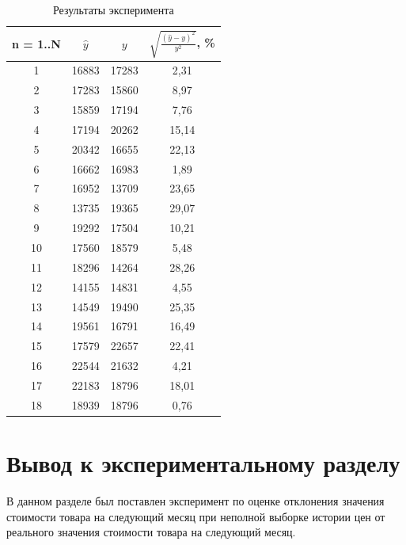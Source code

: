 \documentclass[a4paper,14pt]{extreport}
\begin{document}
\begin{table}[H]
	\caption{Результаты эксперимента}
	\begin{center}
		\begin{tabular}{| c | c | c | c |} 
			\hline
			
			\textbf{n = 1..N} & \textbf{$\hat{y}$} & \textbf{$y$} & \textbf{$\sqrt{\frac{(\hat{y} - y) ^ 2}{y ^ 2}}$, \%} \\  
			
			\hline
			1 & 16883 & 17283 & 2,31 \\
			\hline
			2 & 17283 & 15860 & 8,97 \\
			\hline
			3 & 15859 & 17194 & 7,76 \\
			\hline
			4 & 17194 & 20262 & 15,14 \\
			\hline
			5 & 20342 & 16655 & 22,13 \\
			\hline
			6 & 16662 & 16983 & 1,89 \\
			\hline
			7 & 16952 & 13709 & 23,65 \\
			\hline
			8 & 13735 & 19365 & 29,07 \\
			\hline
			9 & 19292 & 17504 & 10,21 \\
			\hline
			10 & 17560 & 18579 & 5,48 \\
			\hline
			11 & 18296 & 14264 & 28,26 \\
			\hline
			12 & 14155 & 14831 & 4,55 \\
			\hline
			13 & 14549 & 19490 & 25,35 \\
			\hline
			14 & 19561 & 16791 & 16,49 \\
			\hline
			15 & 17579 & 22657 & 22,41 \\
			\hline
			16 & 22544 & 21632 & 4,21 \\
			\hline
			17 & 22183 & 18796 & 18,01 \\
			\hline
			18 & 18939 & 18796 & 0,76 \\
			\hline
		\end{tabular}
	\end{center}
\end{table}

\section*{Вывод к экспериментальному разделу}

В данном разделе был поставлен эксперимент по оценке отклонения значения стоимости товара на следующий месяц при неполной выборке истории цен от реального значения стоимости товара на следующий месяц.
\end{document}
